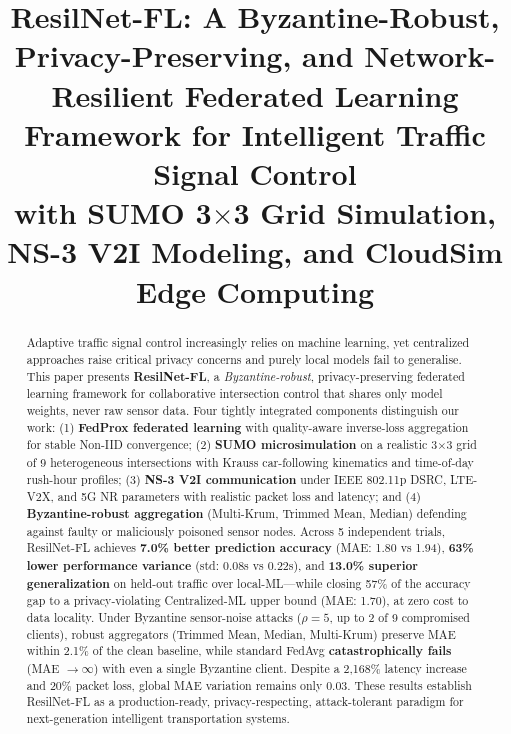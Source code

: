 \documentclass[conference]{IEEEtran}
\begin{document}
\title{ResilNet-FL: A Byzantine-Robust, Privacy-Preserving, and Network-Resilient Federated Learning Framework for Intelligent Traffic Signal Control\\
{\footnotesize with SUMO 3$\times$3 Grid Simulation, NS-3 V2I Modeling, and CloudSim Edge Computing}
}

\author{
}

\maketitle

\begin{abstract}
Adaptive traffic signal control increasingly relies on machine learning, yet centralized approaches raise critical privacy concerns and purely local models fail to generalise. This paper presents \textbf{ResilNet-FL}, a \emph{Byzantine-robust}, privacy-preserving federated learning framework for collaborative intersection control that shares only model weights, never raw sensor data. Four tightly integrated components distinguish our work: (1) \textbf{FedProx federated learning} with quality-aware inverse-loss aggregation for stable Non-IID convergence; (2) \textbf{SUMO microsimulation} on a realistic 3$\times$3 grid of 9 heterogeneous intersections with Krauss car-following kinematics and time-of-day rush-hour profiles; (3) \textbf{NS-3 V2I communication} under IEEE 802.11p DSRC, LTE-V2X, and 5G NR parameters with realistic packet loss and latency; and (4) \textbf{Byzantine-robust aggregation} (Multi-Krum, Trimmed Mean, Median) defending against faulty or maliciously poisoned sensor nodes. Across 5 independent trials, ResilNet-FL achieves \textbf{7.0\% better prediction accuracy} (MAE: 1.80 vs 1.94), \textbf{63\% lower performance variance} (std: 0.08s vs 0.22s), and \textbf{13.0\% superior generalization} on held-out traffic over local-ML—while closing 57\% of the accuracy gap to a privacy-violating Centralized-ML upper bound (MAE: 1.70), at zero cost to data locality. Under Byzantine sensor-noise attacks ($\rho=5$, up to 2 of 9 compromised clients), robust aggregators (Trimmed Mean, Median, Multi-Krum) preserve MAE within 2.1\% of the clean baseline, while standard FedAvg \textbf{catastrophically fails} (MAE $\rightarrow \infty$) with even a single Byzantine client. Despite a 2,168\% latency increase and 20\% packet loss, global MAE variation remains only 0.03. These results establish ResilNet-FL as a production-ready, privacy-respecting, attack-tolerant paradigm for next-generation intelligent transportation systems.
\end{abstract}
\end{document}
